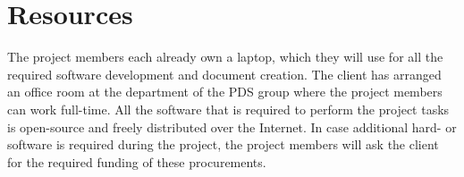 \section{Resources}
The project members each already own a laptop, which they will use for all the required software development and document creation. The client has arranged an office room at the department of the PDS group where the project members can work full-time. All the software that is required to perform the project tasks is open-source and freely distributed over the Internet. In case additional hard- or software is required during the project, the project members will ask the client for the required funding of these procurements.